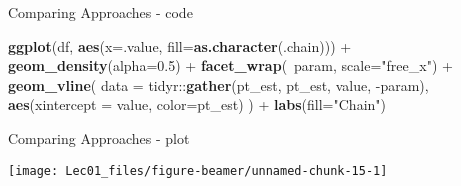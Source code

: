 \documentclass[11pt,ignorenonframetext,]{beamer}
\newenvironment{Shaded}{}{}
\newcommand{\DataTypeTok}[1]{\textcolor[rgb]{0.56,0.13,0.00}{#1}}
\newcommand{\FloatTok}[1]{\textcolor[rgb]{0.25,0.63,0.44}{#1}}
\newcommand{\KeywordTok}[1]{\textcolor[rgb]{0.00,0.44,0.13}{\textbf{#1}}}
\newcommand{\NormalTok}[1]{#1}
\newcommand{\OperatorTok}[1]{\textcolor[rgb]{0.40,0.40,0.40}{#1}}
\newcommand{\StringTok}[1]{\textcolor[rgb]{0.25,0.44,0.63}{#1}}
\let\oldShaded\Shaded
\let\endoldShaded\endShaded
\renewenvironment{Shaded}{\footnotesize\begin{spacing}{0.9}\oldShaded}{\endoldShaded\end{spacing}}
\begin{document}
\begin{frame}[fragile,t]{Comparing Approaches - code}
\protect\hypertarget{comparing-approaches---code}{}

\begin{Shaded}
\begin{Highlighting}[]
\KeywordTok{ggplot}\NormalTok{(df, }\KeywordTok{aes}\NormalTok{(}\DataTypeTok{x=}\NormalTok{.value, }\DataTypeTok{fill=}\KeywordTok{as.character}\NormalTok{(.chain))) }\OperatorTok{+}
\StringTok{  }\KeywordTok{geom_density}\NormalTok{(}\DataTypeTok{alpha=}\FloatTok{0.5}\NormalTok{) }\OperatorTok{+}
\StringTok{  }\KeywordTok{facet_wrap}\NormalTok{(}\OperatorTok{~}\NormalTok{param, }\DataTypeTok{scale=}\StringTok{"free_x"}\NormalTok{) }\OperatorTok{+}
\StringTok{  }\KeywordTok{geom_vline}\NormalTok{(}
    \DataTypeTok{data =}\NormalTok{ tidyr}\OperatorTok{::}\KeywordTok{gather}\NormalTok{(pt_est, pt_est, value, }\OperatorTok{-}\NormalTok{param), }
    \KeywordTok{aes}\NormalTok{(}\DataTypeTok{xintercept =}\NormalTok{ value, }\DataTypeTok{color=}\NormalTok{pt_est)}
\NormalTok{  ) }\OperatorTok{+}
\StringTok{  }\KeywordTok{labs}\NormalTok{(}\DataTypeTok{fill=}\StringTok{"Chain"}\NormalTok{)}
\end{Highlighting}
\end{Shaded}

\end{frame}

\begin{frame}[t]{Comparing Approaches - plot}
\protect\hypertarget{comparing-approaches---plot}{}

\begin{center}\texttt{[image: Lec01\_files/figure-beamer/unnamed-chunk-15-1]} \end{center}

\end{frame}
\end{document}
